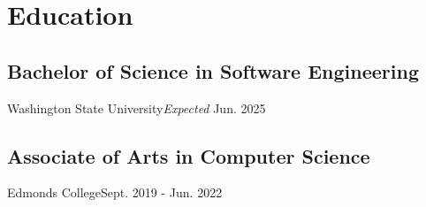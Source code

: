 \section{Education}
\subsection{Bachelor of Science in Software Engineering}{Washington State University}{\textit{Expected} Jun. 2025}
\\ \subsection{Associate of Arts in Computer Science}{Edmonds College}{Sept. 2019 - Jun. 2022}

\vspace{0.2em}
